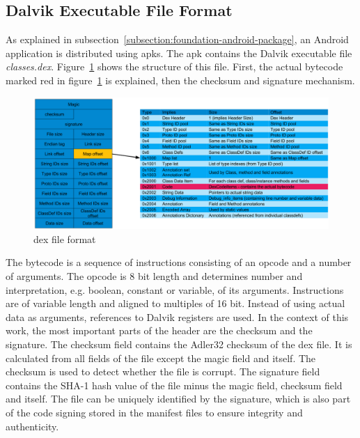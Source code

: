 \subsection{Dalvik Executable File Format} \label{subsection:android-dex}
As explained in subsection~\ref{subsection:foundation-android-package}, an Android application is distributed using \gls{apk}s.
The \gls{apk} contains the Dalvik executable file \textit{classes.dex}.
Figure~\ref{fig:dex} shows the structure of this file.
First, the actual bytecode marked red in figure~\ref{fig:dex} is explained, then the checksum and signature mechanism.
\newline
\begin{figure}[h]
    \centering
    \includegraphics[width=1\textwidth]{data/dex.png}
    \caption{\gls{dex} file format \cite{andevconDalvikART}}
    \label{fig:dex}
\end{figure}
\newline
The bytecode is a sequence of instructions consisting of an opcode and a number of arguments.
The opcode is 8 bit length and determines number and interpretation, e.g. boolean, constant or variable, of its arguments.
Instructions are of variable length and aligned to multiples of 16 bit.
Instead of using actual data as arguments, references to Dalvik registers are used. \cite{androidDalvik} \cite{opcodes}
\newline
In the context of this work, the most important parts of the header are the checksum and the signature.
The checksum field contains the Adler32 checksum of the \gls{dex} file.
It is calculated from all fields of the file except the magic field and itself.
The checksum is used to detect whether the file is corrupt.
The signature field contains the SHA-1 hash value of the file minus the magic field, checksum field and itself.
The file can be uniquely identified by the signature, which is also part of the code signing stored in the manifest files to ensure integrity and authenticity.
